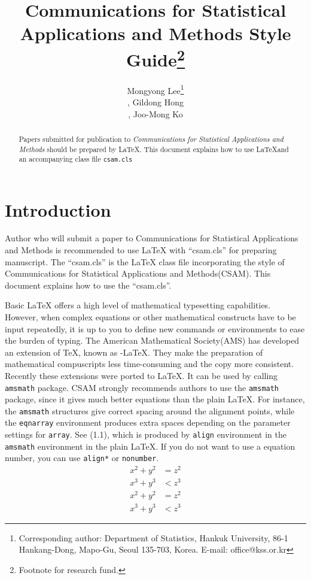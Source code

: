 \documentclass[eng]{csam}
\begin{document}
\title{Communications for Statistical Applications and Methods Style Guide\footnote{Footnote for research fund.}}

\author{Mongyong Lee\footnote{Corresponding author: Department of Statistics, Hankuk University, 86-1 Hankang-Dong, Mapo-Gu, Seoul
135-703, Korea. E-mail: office@kss.or.kr}\address[a]{Department of Statistics, Hankuk University;}, Gildong Hong\address[b]{Department of Statistics, Daehan University},  Joo-Mong Ko\same[a]}

\begin{abstract}
Papers submitted for publication to {\it Communications for Statistical Applications and Methods} should
be prepared by \LaTeX. This document explains how to use \LaTeX and an accompanying class file \texttt{csam.cls}
\end{abstract}


\section{Introduction}
Author who will submit a paper to Communications for Statistical Applications and Methods is recommended
to use \LaTeX{} with ``csam.cls'' for preparing manuscript. The ``csam.cls'' is the \LaTeX{} class file incorporating
the style of Communications for Statistical Applications and Methods(CSAM). This document explains
how to use the ``csam.cls''.

Basic \LaTeX{} offers a high level of mathematical typesetting capabilities. However, when complex
equations or other mathematical constructs have to be input repeatedly, it is up to you to define new
commands or environments to ease the burden of typing. The American Mathematical Society(AMS)
has developed an extension of \TeX, known as \AmS-\LaTeX. They make the preparation of mathematical
compuscripts less time-consuming and the copy more consistent. Recently these extensions were
ported to \LaTeX. It can be used by calling \texttt{amsmath} package. CSAM strongly recommends authors
to use the \texttt{amsmath} package, since it gives much better equations than the plain \LaTeX{}. For instance,
the \texttt{amsmath} structures give correct spacing around the alignment points, while the \texttt{eqnarray} environment
produces extra spaces depending on the parameter settings for \texttt{array}. See (1.1),
which is produced by \texttt{align} environment in the \texttt{amsmath} environment in the plain
\LaTeX. If you do not want to use a equation number,  you can use \texttt{align*} or \texttt{nonumber}.
\begin{align}
x^{2} + y^{2} &= z^{2} \\
x^{3} + y^{3} &< z^{3} \nonumber
\end{align}
\begin{align*}
x^{2} + y^{2} &= z^{2} \\
x^{3} + y^{3} &< z^{3}
\end{align*}
\end{document}
